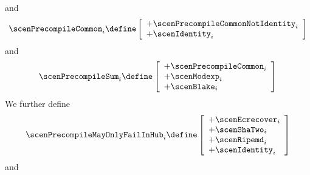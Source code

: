 and
\[
	\scenPrecompileCommon _{i}
	\define
	\left[ \begin{array}{l}
		+ \scenPrecompileCommonNotIdentity _{i} \\
		+ \scenIdentity                    _{i} \\
	\end{array} \right]
\]
and
\[
	\scenPrecompileSum_{i}
	\define
	\left[ \begin{array}{l}
		+ \scenPrecompileCommon _{i} \\
		+ \scenModexp           _{i} \\
		+ \scenBlake            _{i} \\
	\end{array} \right]
\]
We further define
\[
	\scenPrecompileMayOnlyFailInHub _{i}
	\define
	\left[ \begin{array}{l}
		+ \scenEcrecover          _{i} \\
		+ \scenShaTwo             _{i} \\
		+ \scenRipemd             _{i} \\
		+ \scenIdentity           _{i} \\
	\end{array} \right]
\]
and
